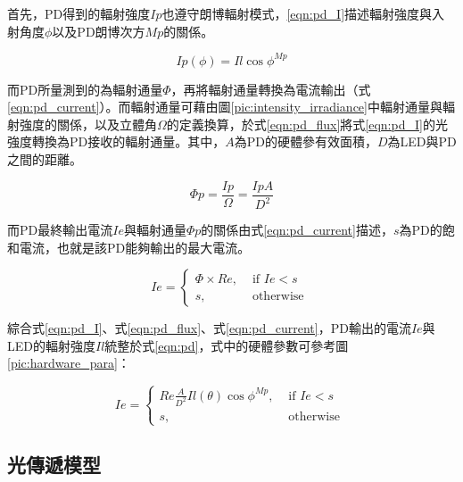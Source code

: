         首先，PD得到的輻射強度$Ip$也遵守朗博輻射模式，\ref{eqn:pd_I}描述輻射強度與入射角度$\phi$以及PD朗博次方$Mp$的關係。

        \begin{equation}
            \label{eqn:pd_I}
            Ip(\phi) = Il \cos \phi^{Mp}
        \end{equation}

        而PD所量測到的為輻射通量$\Phi$，再將輻射通量轉換為電流輸出（式\ref{eqn:pd_current}）。而輻射通量可藉由圖\ref{pic:intensity_irradiance}中輻射通量與輻射強度的關係，以及立體角$\Omega$的定義換算，於式\ref{eqn:pd_flux}將式\ref{eqn:pd_I}的光強度轉換為PD接收的輻射通量。其中，$A$為PD的硬體參有效面積，$D$為LED與PD之間的距離。

        \begin{equation}
            \label{eqn:pd_flux}
            \Phi p = \frac{Ip}{\Omega} = \frac{IpA}{D^2}
        \end{equation}

        而PD最終輸出電流$Ie$與輻射通量$\Phi p$的關係由式\ref{eqn:pd_current}描述，$s$為PD的飽和電流，也就是該PD能夠輸出的最大電流。

        \begin{equation}
            \label{eqn:pd_current}
            Ie = \begin{cases}\Phi\times Re, & \text { if } Ie<s \\ s, & \text { otherwise }\end{cases}
        \end{equation}

        綜合式\ref{eqn:pd_I}、式\ref{eqn:pd_flux}、式\ref{eqn:pd_current}，PD輸出的電流$Ie$與LED的輻射強度$Il$統整於式\ref{eqn:pd}，式中的硬體參數可參考圖\ref{pic:hardware_para}：

        \begin{equation}
            \label{eqn:pd}
            Ie = \begin{cases}Re \frac{A}{D^2}Il(\theta) \cos \phi^{Mp}, & \text { if } Ie<s \\ s, & \text { otherwise }\end{cases}
        \end{equation}

        
        


        

    \subsection{光傳遞模型}
    \label{chp:model}

